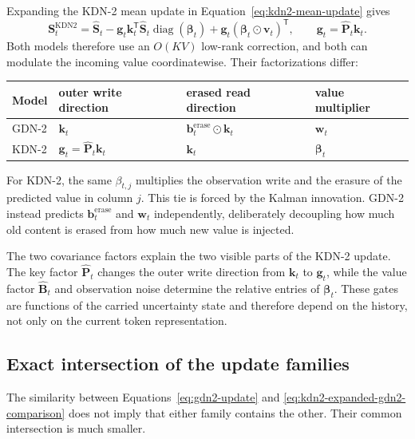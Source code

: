 \documentclass[11pt]{article}
\newcommand{\ve}[1]{\boldsymbol{#1}}
\newcommand{\tr}{\mathsf{T}}
\newcommand{\diag}{\operatorname{diag}}
\begin{document}
Expanding the KDN-2 mean update in Equation~\eqref{eq:kdn2-mean-update} gives
\begin{equation}
  \ve{S}_t^{\mathrm{KDN2}}
  =\widehat{\ve{S}}_t
   -\ve{g}_t\ve{k}_t^{\tr}\widehat{\ve{S}}_t\diag(\ve{\beta}_t)
   +\ve{g}_t(\ve{\beta}_t\odot\ve{v}_t)^{\tr},
  \qquad
  \ve{g}_t=\widehat{\ve{P}}_t\ve{k}_t.
  \label{eq:kdn2-expanded-gdn2-comparison}
\end{equation}
Both models therefore use an $O(KV)$ low-rank correction, and both can modulate the incoming value
coordinatewise.  Their factorizations differ:
\begin{center}
\begin{tabular}{@{}llll@{}}
  \toprule
  Model & outer write direction & erased read direction & value multiplier \\
  \midrule
  GDN-2 & $\ve{k}_t$ & $\ve{b}_t^{\mathrm{erase}}\odot\ve{k}_t$ & $\ve{w}_t$ \\
  KDN-2 & $\ve{g}_t=\widehat{\ve{P}}_t\ve{k}_t$ & $\ve{k}_t$ & $\ve{\beta}_t$ \\
  \bottomrule
\end{tabular}
\end{center}
For KDN-2, the same $\beta_{t,j}$ multiplies the observation write and the erasure of the predicted
value in column $j$.  This tie is forced by the Kalman innovation.  GDN-2 instead predicts
$\ve{b}_t^{\mathrm{erase}}$ and $\ve{w}_t$ independently, deliberately decoupling how much old
content is erased from how much new value is injected.

The two covariance factors explain the two visible parts of the KDN-2 update.  The key factor
$\widehat{\ve{P}}_t$ changes the outer write direction from $\ve{k}_t$ to $\ve{g}_t$, while the
value factor $\widehat{\ve{B}}_t$ and observation noise determine the relative entries of
$\ve{\beta}_t$.  These gates are functions of the carried uncertainty state and therefore depend
on the history, not only on the current token representation.

\subsection{Exact intersection of the update families}

The similarity between Equations~\eqref{eq:gdn2-update} and
\eqref{eq:kdn2-expanded-gdn2-comparison} does not imply that either family contains the other.
Their common intersection is much smaller.
\end{document}
